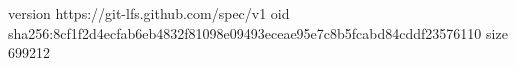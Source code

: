 version https://git-lfs.github.com/spec/v1
oid sha256:8cf1f2d4ecfab6eb4832f81098e09493eceae95e7c8b5fcabd84cddf23576110
size 699212
